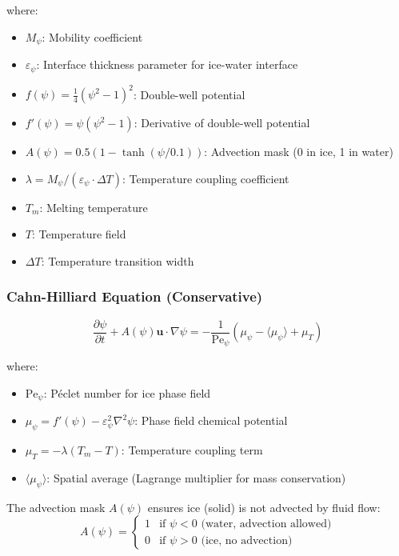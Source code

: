 \documentclass[12pt]{article}
\begin{document}
where:
\begin{itemize}
    \item $M_\psi$: Mobility coefficient
    \item $\varepsilon_\psi$: Interface thickness parameter for ice-water interface
    \item $f(\psi) = \frac{1}{4}(\psi^2 - 1)^2$: Double-well potential
    \item $f'(\psi) = \psi(\psi^2 - 1)$: Derivative of double-well potential
    \item $A(\psi) = 0.5(1 - \tanh(\psi/0.1))$: Advection mask (0 in ice, 1 in water)
    \item $\lambda = M_\psi / (\varepsilon_\psi \cdot \Delta T)$: Temperature coupling coefficient
    \item $T_m$: Melting temperature
    \item $T$: Temperature field
    \item $\Delta T$: Temperature transition width
\end{itemize}

\subsubsection{Cahn-Hilliard Equation (Conservative)}

\begin{equation}
\frac{\partial \psi}{\partial t} + A(\psi) \mathbf{u} \cdot \nabla \psi = -\frac{1}{\text{Pe}_\psi} \left( \mu_\psi - \langle \mu_\psi \rangle + \mu_T \right)
\label{eq:ice_cahn_hilliard}
\end{equation}

where:
\begin{itemize}
    \item $\text{Pe}_\psi$: Péclet number for ice phase field
    \item $\mu_\psi = f'(\psi) - \varepsilon_\psi^2 \nabla^2 \psi$: Phase field chemical potential
    \item $\mu_T = -\lambda (T_m - T)$: Temperature coupling term
    \item $\langle \mu_\psi \rangle$: Spatial average (Lagrange multiplier for mass conservation)
\end{itemize}

The advection mask $A(\psi)$ ensures ice (solid) is not advected by fluid flow:
\begin{equation}
A(\psi) = \begin{cases}
1 & \text{if } \psi < 0 \text{ (water, advection allowed)} \\
0 & \text{if } \psi > 0 \text{ (ice, no advection)}
\end{cases}
\end{equation}
\end{document}
